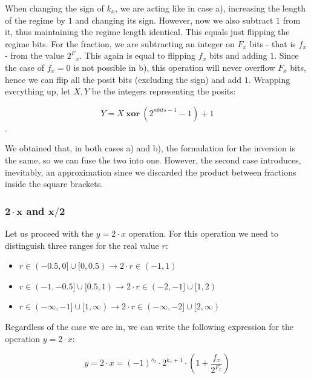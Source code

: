 When changing the sign of $k_x$, we are acting like in case a), increasing the length of the regime by $1$ and changing its sign. However, now we also subtract $1$ from it, thus maintaining the regime length identical. This equals just flipping the regime bits.  For the fraction, we are subtracting an integer on $F_x$ bits - that is $f_x$ - from the value $2^F{_x}$. This again is equal to flipping $f_x$ bits and adding $1$. Since the case of $f_x = 0$ is not possible in b), this operation will never overflow $F_x$ bits, hence we can flip all the posit bits (excluding the sign) and add $1$. Wrapping everything up, let $X,Y$ be the integers representing the posits:

\begin{equation}
    Y = X\ \mathbf{xor}\ (2^{nbits - 1} - 1) + 1
\end{equation}.


We obtained that, in both cases a) and b), the formulation for the inversion is the same, so we can fuse the two into one. However, the second case introduces, inevitably, an approximation since we discarded the product between fractions inside the square brackets.


\subsubsection{$\mathbf{2\cdot x}$ and $\mathbf{x/2}$}

Let us proceed with the $y = 2\cdot x$ operation. For this operation we need to distinguish three ranges for the real value $r$:


\begin{itemize}
    \item[a)] $r \in (-0.5,0] \cup [0,0.5) \xrightarrow{} 2\cdot r \in (-1,1)$
    \item[b)] $r \in (-1,-0.5] \cup [0.5,1) \xrightarrow{} 2\cdot r \in (-2,-1] \cup [1,2) $
    \item[c)] $r \in (-\infty, -1] \cup [1, \infty)  \xrightarrow{} 2\cdot r \in (-\infty, -2] \cup [2, \infty)$
\end{itemize}

Regardless of the case we are in, we can write the following expression for the operation $y = 2 \cdot x$:

\begin{equation}
    y = 2 \cdot x = (-1)^{s_x} \cdot 2^{k_x + 1} \cdot \left(1 + \frac{f_x}{2^{F_x}} \right) 
\end{equation}


